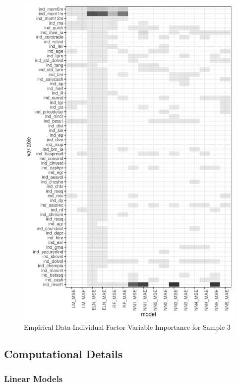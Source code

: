 \documentclass[a4paper, table]{article}
\begin{document}
\begin{figure}
	\includegraphics{empirical_sample_3_vi_ind.pdf}
	\caption{Empirical Data Individual Factor Variable Importance for Sample 3}
\end{figure}

\label{computation}

\newpage

\subsection{Computational Details}

\subsubsection{Linear Models}
\end{document}
